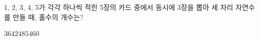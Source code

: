 1, 2, 3, 4, 5가 각각 하나씩 적힌 5장의 카드 중에서 동시에 3장을 뽑아 세 자리 자연수를 만들 때, 홀수의 개수는?
\begin{choices32}{$36$}{$42$}{$48$}{$54$}{$60$}\end{choices32}
